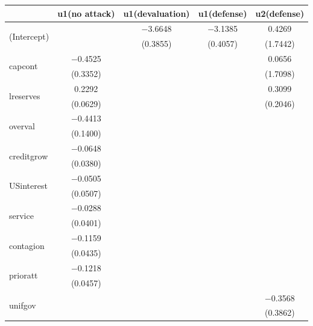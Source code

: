 \documentclass[article]{jss}
\begin{document}
\begin{table}[p]

\begin{table}[htbp]
\begin{center}
\begin{tabular}{lcccc}
\hline
 & u1(no attack) & u1(devaluation) & u1(defense) & u2(defense) \\
\hline
\multirow{2}{*}{(Intercept)} & \multirow{2}{*}{} & $-$3.6648 & $-$3.1385 & 0.4269 \\
 &  & (0.3855) & (0.4057) & (1.7442) \\[2pt]
\multirow{2}{*}{capcont} & $-$0.4525 & \multirow{2}{*}{} & \multirow{2}{*}{} & 0.0656 \\
 & (0.3352) &  &  & (1.7098) \\[2pt]
\multirow{2}{*}{lreserves} & 0.2292 & \multirow{2}{*}{} & \multirow{2}{*}{} & 0.3099 \\
 & (0.0629) &  &  & (0.2046) \\[2pt]
\multirow{2}{*}{overval} & $-$0.4413 & \multirow{2}{*}{} & \multirow{2}{*}{} & \multirow{2}{*}{} \\
 & (0.1400) &  &  &  \\[2pt]
\multirow{2}{*}{creditgrow} & $-$0.0648 & \multirow{2}{*}{} & \multirow{2}{*}{} & \multirow{2}{*}{} \\
 & (0.0380) &  &  &  \\[2pt]
\multirow{2}{*}{USinterest} & $-$0.0505 & \multirow{2}{*}{} & \multirow{2}{*}{} & \multirow{2}{*}{} \\
 & (0.0507) &  &  &  \\[2pt]
\multirow{2}{*}{service} & $-$0.0288 & \multirow{2}{*}{} & \multirow{2}{*}{} & \multirow{2}{*}{} \\
 & (0.0401) &  &  &  \\[2pt]
\multirow{2}{*}{contagion} & $-$0.1159 & \multirow{2}{*}{} & \multirow{2}{*}{} & \multirow{2}{*}{} \\
 & (0.0435) &  &  &  \\[2pt]
\multirow{2}{*}{prioratt} & $-$0.1218 & \multirow{2}{*}{} & \multirow{2}{*}{} & \multirow{2}{*}{} \\
 & (0.0457) &  &  &  \\[2pt]
\multirow{2}{*}{unifgov} & \multirow{2}{*}{} & \multirow{2}{*}{} & \multirow{2}{*}{} & $-$0.3568 \\
 &  &  &  & (0.3862) \\[2pt]

\end{tabular}
\end{center}
\end{table}
\end{table}
\end{document}

